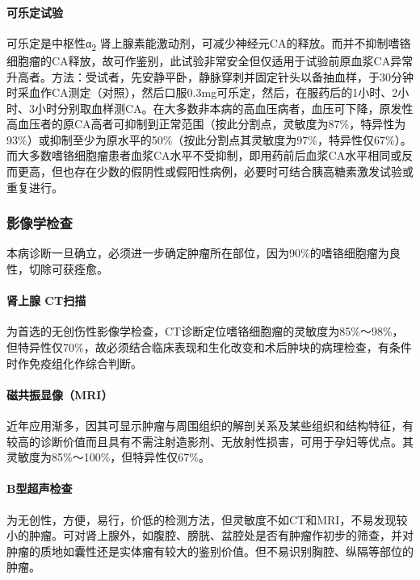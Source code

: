 \paragraph{可乐定试验}

可乐定是中枢性α\textsubscript{2}
肾上腺素能激动剂，可减少神经元CA的释放。而并不抑制嗜铬细胞瘤的CA释放，故可作鉴别，此试验非常安全但仅适用于试验前原血浆CA异常升高者。方法：受试者，先安静平卧，静脉穿刺并固定针头以备抽血样，于30分钟时采血作CA测定（对照），然后口服0.3mg可乐定，然后，在服药后的1小时、2小时、3小时分别取血样测CA。在大多数非本病的高血压病者，血压可下降，原发性高血压者的原CA高者可抑制到正常范围（按此分割点，灵敏度为87\%，特异性为93\%）或抑制至少为原水平的50\%（按此分割点其灵敏度为97\%，特异性仅67\%）。而大多数嗜铬细胞瘤患者血浆CA水平不受抑制，即用药前后血浆CA水平相同或反而更高，但也存在少数的假阴性或假阳性病例，必要时可结合胰高糖素激发试验或重复进行。

\subsubsection{影像学检查}

本病诊断一旦确立，必须进一步确定肿瘤所在部位，因为90\%的嗜铬细胞瘤为良性，切除可获痊愈。

\paragraph{肾上腺 CT扫描}

为首选的无创伤性影像学检查，CT诊断定位嗜铬细胞瘤的灵敏度为85\%～98\%，但特异性仅70\%，故必须结合临床表现和生化改变和术后肿块的病理检查，有条件时作免疫组化作综合判断。

\paragraph{磁共振显像（MRI）}

近年应用渐多，因其可显示肿瘤与周围组织的解剖关系及某些组织和结构特征，有较高的诊断价值而且具有不需注射造影剂、无放射性损害，可用于孕妇等优点。其灵敏度为85\%～100\%，但特异性仅67\%。

\paragraph{B型超声检查}

为无创性，方便，易行，价低的检测方法，但灵敏度不如CT和MRI，不易发现较小的肿瘤。可对肾上腺外，如腹腔、膀胱、盆腔处是否有肿瘤作初步的筛查，并对肿瘤的质地如囊性还是实体瘤有较大的鉴别价值。但不易识别胸腔、纵隔等部位的肿瘤。

